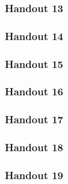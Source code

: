 \subsubsection{Handout 13}
\subsubsection{Handout 14}
\subsubsection{Handout 15}
\subsubsection{Handout 16}
\subsubsection{Handout 17}
\subsubsection{Handout 18}
\subsubsection{Handout 19}

